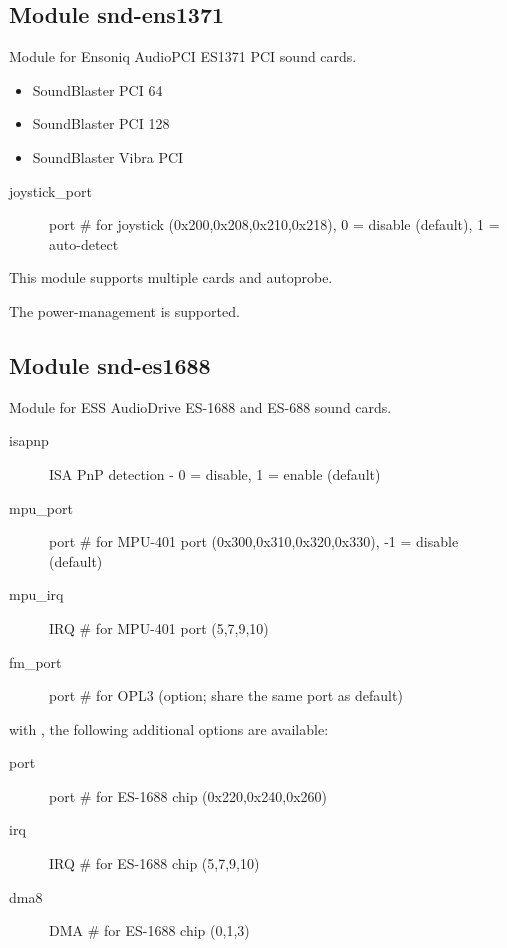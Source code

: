 \documentclass[a4paper,8pt,english]{sphinxmanual}
\begin{document}
\subsection{Module snd-ens1371}
\label{sound/alsa-configuration:module-snd-ens1371}
Module for Ensoniq AudioPCI ES1371 PCI sound cards.
\begin{itemize}
\item {} 
SoundBlaster PCI 64

\item {} 
SoundBlaster PCI 128

\item {} 
SoundBlaster Vibra PCI

\end{itemize}
\begin{description}
\item[{joystick\_port}] \leavevmode
port \# for joystick (0x200,0x208,0x210,0x218), 0 = disable
(default), 1 = auto-detect

\end{description}

This module supports multiple cards and autoprobe.

The power-management is supported.


\subsection{Module snd-es1688}
\label{sound/alsa-configuration:module-snd-es1688}
Module for ESS AudioDrive ES-1688 and ES-688 sound cards.
\begin{description}
\item[{isapnp}] \leavevmode
ISA PnP detection - 0 = disable, 1 = enable (default)

\item[{mpu\_port}] \leavevmode
port \# for MPU-401 port (0x300,0x310,0x320,0x330), -1 = disable (default)

\item[{mpu\_irq}] \leavevmode
IRQ \# for MPU-401 port (5,7,9,10)

\item[{fm\_port}] \leavevmode
port \# for OPL3 (option; share the same port as default)

\end{description}

with , the following additional options are available:
\begin{description}
\item[{port}] \leavevmode
port \# for ES-1688 chip (0x220,0x240,0x260)

\item[{irq}] \leavevmode
IRQ \# for ES-1688 chip (5,7,9,10)

\item[{dma8}] \leavevmode
DMA \# for ES-1688 chip (0,1,3)

\end{description}
\end{document}
